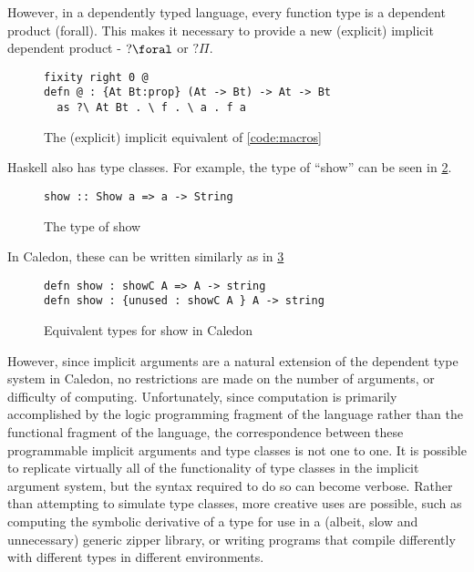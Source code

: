 However, in a dependently typed language, every function type is a dependent product
(forall).  This makes it necessary to provide a new (explicit) implicit dependent product - $?\foral$ or $?\Pi$.


\begin{figure}[H]
\begin{lstlisting}
fixity right 0 @
defn @ : {At Bt:prop} (At -> Bt) -> At -> Bt
  as ?\ At Bt . \ f . \ a . f a

\end{lstlisting}
\caption{The (explicit) implicit equivalent of \ref{code:macros}}
\label{code:expimp}
\end{figure}

Haskell also has type classes. For example, the type of “show” can be seen in \ref{code:showty}.

\begin{figure}[H]
\begin{lstlisting}
show :: Show a => a -> String
\end{lstlisting}
\caption{The type of show}
\label{code:showty}
\end{figure}

In Caledon, these can be written similarly as in \ref{code:cshowty}

\begin{figure}[H]
\begin{lstlisting}
defn show : showC A => A -> string
defn show : {unused : showC A } A -> string
\end{lstlisting}
\caption{Equivalent types for show in Caledon}
\label{code:cshowty}
\end{figure}

However, since implicit arguments are a natural extension of the dependent type
system in Caledon, no restrictions are made on the number of arguments, or difficulty
of computing. Unfortunately, since computation is primarily accomplished by the logic
programming fragment of the language rather than the functional fragment of the language,
the correspondence between these programmable implicit arguments and type
classes is not one to one. It is possible to replicate virtually all of the functionality of
type classes in the implicit argument system, but the syntax required to do so can become
verbose. Rather than attempting to simulate type classes, more creative uses are
possible, such as computing the symbolic derivative of a type for use in a (albeit, slow
and unnecessary) generic zipper library, or writing programs that compile differently
with different types in different environments.
